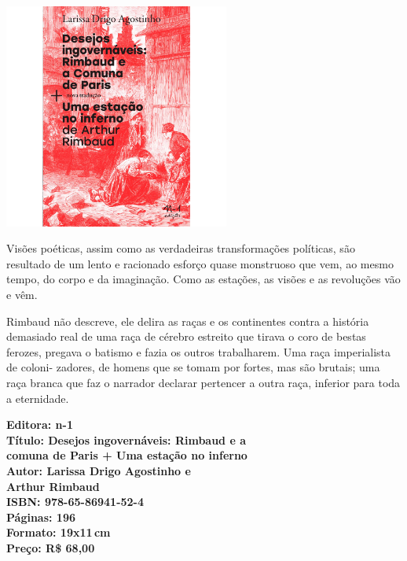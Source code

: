 \pagebreak

\begin{center}
\hspace*{-3.6cm}
\hspace*{3.1cm}\includegraphics[width=74mm]{./CAPAS/N-1_RIMBAUD.jpg}
\end{center}

\hspace*{-7cm}\hrulefill\hspace*{-7cm}

\medskip

\noindent{}Visões poéticas, assim como as verdadeiras transformações políticas, são resultado de um lento e racionado esforço quase monstruoso que vem, ao mesmo tempo, do corpo e da imaginação. Como as estações, as visões e as revoluções vão e vêm.

 Rimbaud não descreve, ele delira as raças e os continentes contra a história demasiado real de uma raça de cérebro estreito que tirava o coro de bestas ferozes, pregava o batismo e fazia os outros trabalharem. Uma raça imperialista de coloni- zadores, de homens que se tomam por fortes, mas são brutais; uma raça branca que faz o narrador declarar pertencer a outra raça, inferior para toda a eternidade.
\vfill

\hspace*{-.4cm}\begin{minipage}[c]{1\linewidth}
\small\textbf{
\hspace*{-.1cm}Editora: n-1\\
Título: Desejos ingovernáveis: Rimbaud e a\\comuna de Paris + Uma estação no inferno\\
Autor: Larissa Drigo Agostinho e\\Arthur Rimbaud\\
ISBN: 978-65-86941-52-4\\
Páginas: 196\\
Formato: 19x11\,cm\\
Preço: R\$ 68,00\\
}
\end{minipage}

